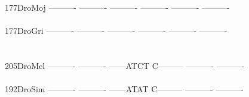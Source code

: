 \documentclass[11pt,twoside,reqno,a4paper]{article}
\begin{document}
{177\hspace*{2\charwidth}DroMoj	----------	----------	----------	----------	----------	----------	\\
\hspace*{5\charwidth}\hspace*{7\charwidth}\hspace*{1\charwidth}\hspace*{1\charwidth}\hspace*{1\charwidth}\hspace*{1\charwidth}\hspace*{1\charwidth}\hspace*{1\charwidth}\\
177\hspace*{2\charwidth}DroGri	----------	----------	----------	----------	----------	----------	\\
\hspace*{5\charwidth}\hspace*{7\charwidth}\hspace*{1\charwidth}\hspace*{1\charwidth}\hspace*{1\charwidth}\hspace*{1\charwidth}\hspace*{1\charwidth}\hspace*{1\charwidth}\\
\\
205\hspace*{2\charwidth}DroMel	----------	----------	------ATCT	C---------	----------	----------	\\
\hspace*{5\charwidth}\hspace*{7\charwidth}\hspace*{1\charwidth}\hspace*{1\charwidth}\hspace*{1\charwidth}\hspace*{1\charwidth}\hspace*{1\charwidth}\hspace*{1\charwidth}\\
192\hspace*{2\charwidth}DroSim	----------	----------	------ATAT	C---------	----------	----------	\\
\hspace*{5\charwidth}\hspace*{7\charwidth}\hspace*{1\charwidth}\hspace*{1\charwidth}\hspace*{1\charwidth}\hspace*{1\charwidth}\hspace*{1\charwidth}\hspace*{1\charwidth}\\
}
\end{document}
